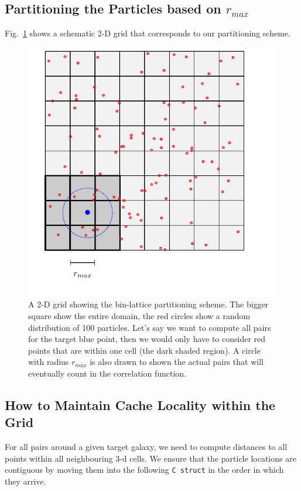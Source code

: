 \documentclass[preprint, 12pt, authoryear]{elsarticle}
\newcommand{\rmax}{\ensuremath{{r_{max}}}\xspace}
\begin{document}
\subsection{Partitioning the Particles based on \rmax}
Fig.~\ref{fig:grid} shows a schematic 2-D grid that corresponds to our partitioning scheme.
\begin{figure}[htbp]
\centering
\includegraphics[clip=true]{tikz_grid}
\caption{A 2-D grid showing the bin-lattice partitioning scheme. The bigger square show the entire 
domain, the red circles show a random distribution of 100 particles. Let's say we want to compute all pairs 
for the target blue point, then we would only have to consider red points that are within one cell (the dark shaded region). 
A circle with radius \rmax is also drawn to shown the actual pairs that will eventually count in the correlation function.} 
\label{fig:grid}
\end{figure}


\subsection{How to Maintain Cache Locality within the Grid}
For all pairs around a given target galaxy, we need to compute distances to all points within all neighbouring 3-d cells. 
We ensure that the particle locations are contiguous by moving them into the following \texttt{C struct} in the order in which they arrive. 
\end{document}
